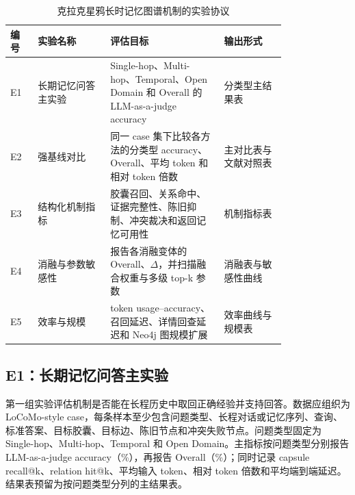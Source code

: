 \documentclass[a4paper,fleqn]{cas-sc}
\begin{document}
\begin{CJK*}{UTF8}{gbsn}
\begin{table}[t]
\centering
\small
\caption{克拉克星鸦长时记忆图谱机制的实验协议}
\label{tab:nutcracker-experiments}
\setlength{\tabcolsep}{3pt}
\begin{tabular}{P{0.08\linewidth}P{0.21\linewidth}P{0.33\linewidth}P{0.18\linewidth}}
\toprule
编号 & 实验名称 & 评估目标 & 输出形式 \\
\midrule
E1 & 长期记忆问答主实验 & Single-hop、Multi-hop、Temporal、Open Domain 和 Overall 的 LLM-as-a-judge accuracy & 分类型主结果表 \\
E2 & 强基线对比 & 同一 case 集下比较各方法的分类型 accuracy、Overall、平均 token 和相对 token 倍数 & 主对比表与文献对照表 \\
E3 & 结构化机制指标 & 胶囊召回、关系命中、证据完整性、陈旧抑制、冲突裁决和返回记忆可用性 & 机制指标表 \\
E4 & 消融与参数敏感性 & 报告各消融变体的 Overall、$\Delta$，并扫描融合权重与多级 top-k 参数 & 消融表与敏感性曲线 \\
E5 & 效率与规模 & token usage--accuracy、召回延迟、详情回查延迟和 Neo4j 图规模扩展 & 效率曲线与规模表 \\
\bottomrule
\end{tabular}
\end{table}

\subsection{E1：长期记忆问答主实验}

第一组实验评估机制是否能在长程历史中取回正确经验并支持回答。数据应组织为 LoCoMo-style case，每条样本至少包含问题类型、长程对话或记忆序列、查询、标准答案、目标胶囊、目标边、陈旧节点和冲突失败节点。问题类型固定为 Single-hop、Multi-hop、Temporal 和 Open Domain。主指标按问题类型分别报告 LLM-as-a-judge accuracy（\%），再报告 Overall（\%）；同时记录 capsule recall@k、relation hit@k、平均输入 token、相对 token 倍数和平均端到端延迟。结果表预留为按问题类型分列的主结果表。


\end{CJK*}
\end{document}
